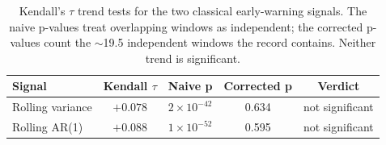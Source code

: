 \begin{table}[!ht]
    \centering
    \small
    \caption[Early-warning trends: naive versus corrected significance.]{Kendall's
    $\tau$ trend tests for the two classical early-warning signals. The naive
    p-values treat overlapping windows as independent; the corrected p-values
    count the $\sim$19.5 independent windows the record contains. Neither trend is
    significant.}
    \label{tab:ews}
    \begin{tabular}{@{}lcccc@{}}
        \toprule
        \textbf{Signal} & \textbf{Kendall $\tau$} & \textbf{Naive p} & \textbf{Corrected p} & \textbf{Verdict} \\
        \midrule
        Rolling variance & $+0.078$ & $2\times10^{-42}$ & 0.634 & not significant \\
        Rolling AR(1)     & $+0.088$ & $1\times10^{-52}$ & 0.595 & not significant \\
        \bottomrule
    \end{tabular}
\end{table}
